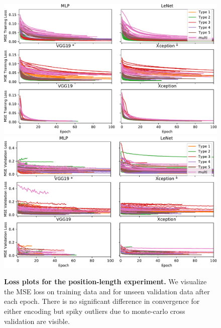 \documentclass[journal]{vgtc}                %
\begin{document}
\begin{figure}[p]
	\centering
	  \includegraphics[width=\linewidth]{../gfx/figure4_training_loss_with_multi.pdf}
	  \includegraphics[width=\linewidth]{../gfx/figure4_val_loss_with_multi.pdf}
  \caption{\textbf{Loss plots for the position-length experiment.} We visualize the MSE loss on training data and for unseen validation data after each epoch. There is no significant difference in convergence for either encoding but spiky outliers due to monte-carlo cross validation are visible.}
	\label{fig:fig4_loss}
\end{figure}
\end{document}
